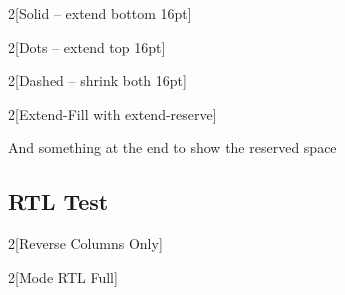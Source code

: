 \documentclass{article}
\begin{document}
\begin{multicols}{2}[Solid -- extend bottom 16pt]
  \lipsum[1]
\end{multicols}

\begin{multicols}{2}[Dots -- extend top 16pt]
  \lipsum[1]
\end{multicols}

\begin{multicols}{2}[Dashed -- shrink both 16pt]
  \lipsum[1]
\end{multicols}

\begin{multicols}{2}[Extend-Fill with extend-reserve]
  \lipsum[1-5]
\end{multicols}
And something at the end to show the reserved space

\subsection*{RTL Test}

  \RLmulticolcolumns

\begin{multicols}{2}[Reverse Columns Only]
  \lipsum[1]
\end{multicols}

\begin{RTL}
  \begin{multicols}{2}[Mode RTL Full]
    \lipsum[1]
  \end{multicols}
\end{RTL}
\end{document}
